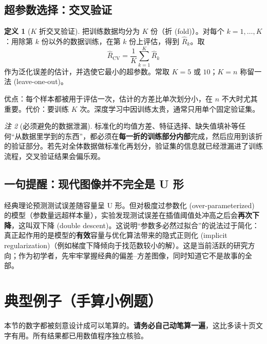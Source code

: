 \documentclass[UTF8,a4paper,11pt]{ctexart}
\theoremstyle{definition}
\newtheorem{definition}{定义}[section]
\theoremstyle{plain}
\theoremstyle{remark}
\newtheorem{remark}[definition]{注}
\newcommand{\eng}[1]{\textup{(#1)}}
\begin{document}
\subsection{超参数选择：交叉验证}

\begin{definition}[$K$ 折交叉验证]\label{def:cv}
把训练数据均分为 $K$ 份（折 \eng{fold}）。对每个 $k=1,\dots,K$：用除第 $k$ 份以外的数据训练，在第 $k$ 份上评估，得到 $\hat R_k$。取
\[
  \hat R_{\text{CV}}=\frac1K\sum_{k=1}^{K}\hat R_k
\]
作为泛化误差的估计，并选使它最小的超参数。常取 $K=5$ 或 $10$；$K=n$ 称留一法 \eng{leave-one-out}。
\end{definition}

优点：每个样本都被用于评估一次，估计的方差比单次划分小，在 $n$ 不大时尤其重要。代价：要训练 $K$ 次。深度学习中因训练太贵，通常只用单个固定验证集。

\begin{remark}[必须避免的数据泄漏]
标准化的均值方差、特征选择、缺失值填补等任何“从数据里学到的东西”，都必须在\textbf{每一折的训练部分内部}完成，然后应用到该折的验证部分。若先对全体数据做标准化再划分，验证集的信息就已经泄漏进了训练流程，交叉验证结果会偏乐观。
\end{remark}

\subsection{一句提醒：现代图像并不完全是 U 形}

经典理论预测测试误差随容量呈 U 形。但对极度过参数化 \eng{over-parameterized} 的模型（参数量远超样本量），实验发现测试误差在插值阈值处冲高之后会\textbf{再次下降}，这叫双下降 \eng{double descent}。这说明“参数多必然过拟合”的说法过于简化：真正起作用的是模型的\textbf{有效}容量与优化算法带来的隐式正则化 \eng{implicit regularization}（例如梯度下降倾向于找范数较小的解）。这是当前活跃的研究方向；作为初学者，先牢牢掌握经典的偏差--方差图像，同时知道它不是故事的全部。

\section{典型例子（手算小例题）}\label{sec:example}

本节的数字都被刻意设计成可以笔算的。\textbf{请务必自己动笔算一遍}，这比多读十页文字有用。所有结果都已用数值程序独立核验。
\end{document}

